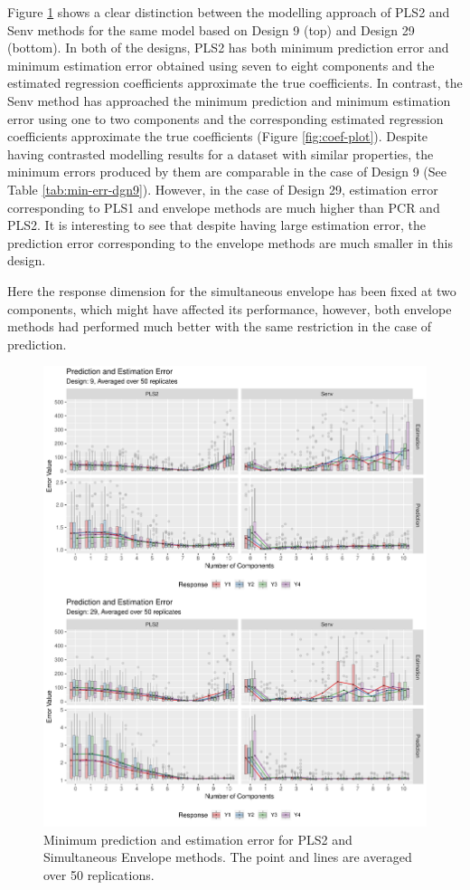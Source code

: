 \documentclass[12pt,3p,authoryear]{elsarticle}
\begin{document}
Figure \ref{fig:err-plot} shows a clear distinction between the
modelling approach of PLS2 and Senv methods for the same model based on
Design 9 (top) and Design 29 (bottom). In both of the designs, PLS2 has
both minimum prediction error and minimum estimation error obtained
using seven to eight components and the estimated regression
coefficients approximate the true coefficients. In contrast, the Senv
method has approached the minimum prediction and minimum estimation
error using one to two components and the corresponding estimated
regression coefficients approximate the true coefficients (Figure
\ref{fig:coef-plot}). Despite having contrasted modelling results for a
dataset with similar properties, the minimum errors produced by them are
comparable in the case of Design 9 (See Table \ref{tab:min-err-dgn9}).
However, in the case of Design 29, estimation error corresponding to
PLS1 and envelope methods are much higher than PCR and PLS2. It is
interesting to see that despite having large estimation error, the
prediction error corresponding to the envelope methods are much smaller
in this design.

Here the response dimension for the simultaneous envelope has been fixed
at two components, which might have affected its performance, however,
both envelope methods had performed much better with the same
restriction in the case of prediction.

\begin{figure}
\includegraphics[width=1\linewidth]{Images/pdf/err-plot-1} \caption{Minimum prediction and estimation error for PLS2 and Simultaneous Envelope methods. The point and lines are averaged over 50 replications.}\label{fig:err-plot}
\end{figure}
\end{document}
